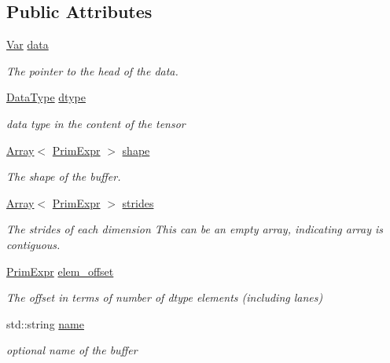 \subsection*{Public Attributes}
\begin{DoxyCompactItemize}
\item 
\hyperlink{classtvm_1_1tir_1_1Var}{Var} \hyperlink{classtvm_1_1tir_1_1BufferNode_a2d6bbcf9ccfa6e449fb024fa1bff4e3b}{data}
\begin{DoxyCompactList}\small\item\em The pointer to the head of the data. \end{DoxyCompactList}\item 
\hyperlink{namespacetvm_a41918af1a1dc386388639a9d3ad06c5d}{Data\+Type} \hyperlink{classtvm_1_1tir_1_1BufferNode_acf0d9633c7c746acb419f09a687bcc77}{dtype}
\begin{DoxyCompactList}\small\item\em data type in the content of the tensor \end{DoxyCompactList}\item 
\hyperlink{classtvm_1_1Array}{Array}$<$ \hyperlink{classtvm_1_1PrimExpr}{Prim\+Expr} $>$ \hyperlink{classtvm_1_1tir_1_1BufferNode_a5372baafb343f5fb263f5507b079412e}{shape}
\begin{DoxyCompactList}\small\item\em The shape of the buffer. \end{DoxyCompactList}\item 
\hyperlink{classtvm_1_1Array}{Array}$<$ \hyperlink{classtvm_1_1PrimExpr}{Prim\+Expr} $>$ \hyperlink{classtvm_1_1tir_1_1BufferNode_ac18ddd10b79a30ae57d3a8283686259d}{strides}
\begin{DoxyCompactList}\small\item\em The strides of each dimension This can be an empty array, indicating array is contiguous. \end{DoxyCompactList}\item 
\hyperlink{classtvm_1_1PrimExpr}{Prim\+Expr} \hyperlink{classtvm_1_1tir_1_1BufferNode_a92b84a76c975399a028b61e4b99ac87b}{elem\+\_\+offset}
\begin{DoxyCompactList}\small\item\em The offset in terms of number of dtype elements (including lanes) \end{DoxyCompactList}\item 
std\+::string \hyperlink{classtvm_1_1tir_1_1BufferNode_a338ae208f36a89b87e4bb51c8e8f2b10}{name}
\begin{DoxyCompactList}\small\item\em optional name of the buffer \end{DoxyCompactList}\item 

\end{DoxyCompactItemize}
